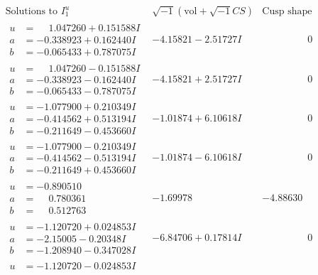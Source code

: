 \documentclass[1p]{elsarticle_modified}
\theoremstyle{definition}
\newcommand{\I}{\sqrt{-1}}
\begin{document}
$$\begin{array}{c|c|c}  
\text{Solutions to }I^u_{1}& \I (\text{vol} + \sqrt{-1}CS) & \text{Cusp shape}\\
 \hline 
\begin{aligned}
u &= \phantom{-}1.047260 + 0.151588 I \\
a &= -0.338923 + 0.162440 I \\
b &= -0.065433 + 0.787075 I\end{aligned}
 & -4.15821 - 2.51727 I & \phantom{-0.000000 } 0 \\ \hline\begin{aligned}
u &= \phantom{-}1.047260 - 0.151588 I \\
a &= -0.338923 - 0.162440 I \\
b &= -0.065433 - 0.787075 I\end{aligned}
 & -4.15821 + 2.51727 I & \phantom{-0.000000 } 0 \\ \hline\begin{aligned}
u &= -1.077900 + 0.210349 I \\
a &= -0.414562 + 0.513194 I \\
b &= -0.211649 - 0.453660 I\end{aligned}
 & -1.01874 + 6.10618 I & \phantom{-0.000000 } 0 \\ \hline\begin{aligned}
u &= -1.077900 - 0.210349 I \\
a &= -0.414562 - 0.513194 I \\
b &= -0.211649 + 0.453660 I\end{aligned}
 & -1.01874 - 6.10618 I & \phantom{-0.000000 } 0 \\ \hline\begin{aligned}
u &= -0.890510\phantom{ +0.000000I} \\
a &= \phantom{-}0.780361\phantom{ +0.000000I} \\
b &= \phantom{-}0.512763\phantom{ +0.000000I}\end{aligned}
 & -1.69978\phantom{ +0.000000I} & -4.88630\phantom{ +0.000000I} \\ \hline\begin{aligned}
u &= -1.120720 + 0.024853 I \\
a &= -2.15005 - 0.20348 I \\
b &= -1.208940 - 0.347028 I\end{aligned}
 & -6.84706 + 0.17814 I & \phantom{-0.000000 } 0 \\ \hline\begin{aligned}
u &= -1.120720 - 0.024853 I \\

\end{aligned}
\end{array}$$
\end{document}
